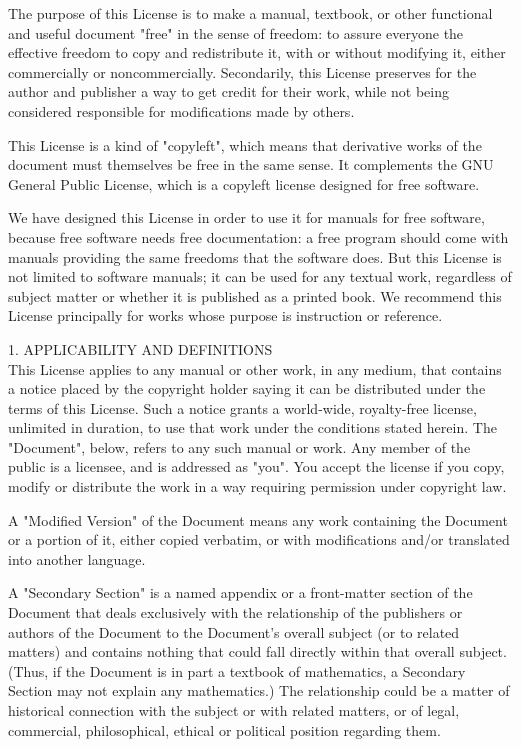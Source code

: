 \documentclass[oneside,12pt]{memoir} %
\begin{document}
The purpose of this License is to make a manual, textbook, or other functional and useful document "free" in the sense of freedom: to assure everyone the effective freedom to copy and redistribute it, with or without modifying it, either commercially or noncommercially. Secondarily, this License preserves for the author and publisher a way to get credit for their work, while not being considered responsible for modifications made by others.

This License is a kind of "copyleft", which means that derivative works of the document must themselves be free in the same sense. It complements the GNU General Public License, which is a copyleft license designed for free software.

We have designed this License in order to use it for manuals for free software, because free software needs free documentation: a free program should come with manuals providing the same freedoms that the software does. But this License is not limited to software manuals; it can be used for any textual work, regardless of subject matter or whether it is published as a printed book. We recommend this License principally for works whose purpose is instruction or reference.

1. APPLICABILITY AND DEFINITIONS\\

This License applies to any manual or other work, in any medium, that contains a notice placed by the copyright holder saying it can be distributed under the terms of this License. Such a notice grants a world-wide, royalty-free license, unlimited in duration, to use that work under the conditions stated herein. The "Document", below, refers to any such manual or work. Any member of the public is a licensee, and is addressed as "you". You accept the license if you copy, modify or distribute the work in a way requiring permission under copyright law.

A "Modified Version" of the Document means any work containing the Document or a portion of it, either copied verbatim, or with modifications and/or translated into another language.

A "Secondary Section" is a named appendix or a front-matter section of the Document that deals exclusively with the relationship of the publishers or authors of the Document to the Document's overall subject (or to related matters) and contains nothing that could fall directly within that overall subject. (Thus, if the Document is in part a textbook of mathematics, a Secondary Section may not explain any mathematics.) The relationship could be a matter of historical connection with the subject or with related matters, or of legal, commercial, philosophical, ethical or political position regarding them.
\end{document}

